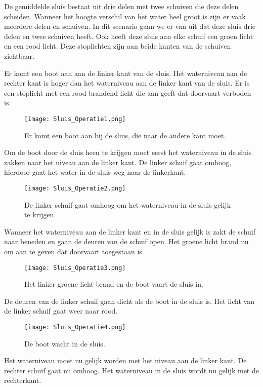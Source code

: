 \documentclass[../verslag.tex]{subfiles}
\begin{document}
De gemiddelde sluis bestaat uit drie delen met twee schuiven die deze delen scheiden. Wanneer het hoogte verschil van het water heel groot is zijn er vaak meerdere delen en schuiven. In dit scenario gaan we er van uit dat deze sluis drie delen en twee schuiven heeft. Ook heeft deze sluis aan elke schuif een groen licht en een rood licht. Deze stoplichten zijn aan beide kanten van de schuiven zichtbaar.

Er komt een boot aan aan de linker kant van de sluis. Het waterniveau aan de rechter kant is hoger dan het waterniveau aan de linker kant van de sluis. Er is een stoplicht met een rood brandend licht die aan geeft dat doorvaart verboden is.

\begin{figure}[H]
	\texttt{[image: Sluis\_Operatie1.png]}
	\caption{
		Er komt een boot aan bij de sluis, die naar de andere kant moet.
	}
	\label{sluis_op1}
\end{figure}

Om de boot door de sluis heen te krijgen moet eerst het waterniveau in de sluis zakken naar het niveau aan de linker kant. De linker schuif gaat omhoog, hierdoor gaat het water in de sluis weg naar de linkerkant.

\begin{figure}[H]
	\texttt{[image: Sluis\_Operatie2.png]}
	\caption{
		De linker schuif gaat omhoog om het waterniveau in de sluis gelijk te krijgen.
	}
	\label{sluis_op2}
\end{figure}

Wanneer het waterniveau aan de linker kant en in de sluis gelijk is zakt de schuif naar beneden en gaan de deuren van de schuif open. Het groene licht brand nu om aan te geven dat doorvaart toegestaan is.

\begin{figure}[H]
	\texttt{[image: Sluis\_Operatie3.png]}
	\caption{
		Het linker groene licht brand en de boot vaart de sluis in.
	}
	\label{sluis_op3}
\end{figure}

De deuren van de linker schuif gaan dicht als de boot in de sluis is. Het licht van de linker schuif gaat weer naar rood.

\begin{figure}[H]
	\texttt{[image: Sluis\_Operatie4.png]}
	\caption{
		De boot wacht in de sluis.
	}
	\label{sluis_op4}
\end{figure}

Het waterniveau moet nu gelijk worden met het niveau aan de linker kant. De rechter schuif gaat nu omhoog. Het waterniveau in de sluis wordt nu gelijk met de rechterkant.
\end{document}
